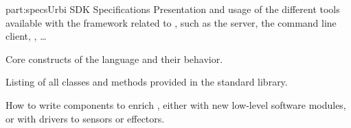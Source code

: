 \begin{partDescription}{part:specs}{Urbi SDK Specifications}
%
  Presentation and usage of the different tools available with the
  \urbi framework related to \us, such as the \urbi server, the
  command line client, \umake, \ldots

%
  Core constructs of the language and their behavior.

%
  Listing of all classes and methods provided in the standard library.

%
  How to write \Cxx components to enrich \us, either with new
  low-level software modules, or with drivers to sensors or effectors.

\end{partDescription}




